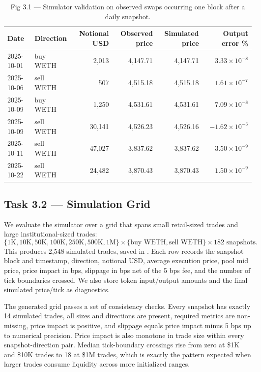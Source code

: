 \begin{table}[t]
    \centering
    \small
    \caption{Fig 3.1 --- Simulator validation on observed swaps occurring one block after a daily snapshot.}
    \label{tab:fig31-validation}
    \begin{tabular}{llrrrr}
        \toprule
        Date & Direction & Notional USD & Observed price & Simulated price & Output error \% \\
        \midrule
        2025-10-01 & buy WETH  & 2,013  & 4,147.71 & 4,147.71 & $3.33{\times}10^{-8}$ \\
        2025-10-06 & sell WETH & 507    & 4,515.18 & 4,515.18 & $1.61{\times}10^{-7}$ \\
        2025-10-09 & buy WETH  & 1,250  & 4,531.61 & 4,531.61 & $7.09{\times}10^{-8}$ \\
        2025-10-09 & sell WETH & 30,141 & 4,526.23 & 4,526.16 & $-1.62{\times}10^{-3}$ \\
        2025-10-11 & sell WETH & 47,027 & 3,837.62 & 3,837.62 & $3.50{\times}10^{-9}$ \\
        2025-10-22 & sell WETH & 24,482 & 3,870.43 & 3,870.43 & $1.50{\times}10^{-9}$ \\
        \bottomrule
    \end{tabular}
\end{table}

\subsection{Task 3.2 --- Simulation Grid}
\label{subsec:m3-task32}

We evaluate the simulator over a grid that spans small retail-sized trades and
large institutional-sized trades:
\[
    \{1\mathrm{K},10\mathrm{K},50\mathrm{K},100\mathrm{K},250\mathrm{K},
    500\mathrm{K},1\mathrm{M}\}
    \times
    \{\text{buy WETH},\text{sell WETH}\}
    \times
    182\text{ snapshots}.
\]
This produces 2,548 simulated trades, saved in
.  Each row records the snapshot block and
timestamp, direction, notional USD, average execution price, pool mid price,
price impact in bps, slippage in bps net of the 5 bps fee, and the number of
tick boundaries crossed.  We also store token input/output amounts and the
final simulated price/tick as diagnostics.

The generated grid passes a set of consistency checks.  Every snapshot has
exactly 14 simulated trades, all sizes and directions are present, required
metrics are non-missing, price impact is positive, and slippage equals price
impact minus 5 bps up to numerical precision.  Price impact is also monotone in
trade size within every snapshot-direction pair.  Median tick-boundary
crossings rise from zero at \$1K and \$10K trades to 18 at \$1M trades, which
is exactly the pattern expected when larger trades consume liquidity across
more initialized ranges.

